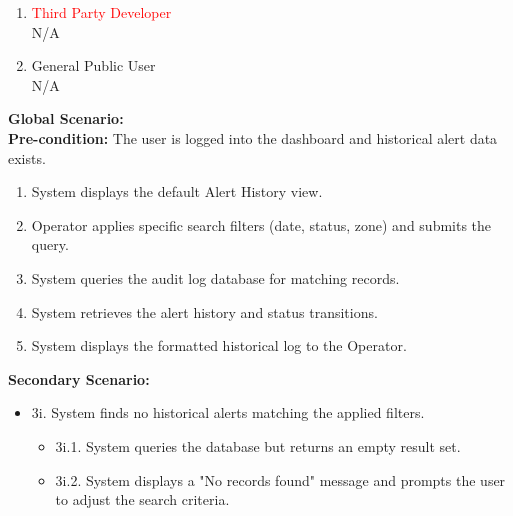{\begin{enumerate}[{\bf BE1.}]
\begin{enumerate}[{\bf VP1.}]
            {\bf Secondary Scenario:}
            \begin{itemize}
                \item[] {4i.} System finds no historical alerts matching the applied filters.
                \begin{itemize}
                    \item[] {4i.1.} System queries the database but returns an empty result set.
                    \item[] {4i.2.} System displays a "No historical alerts found for the selected criteria" message and prompts the Operator to clear or adjust the filters.
                \end{itemize}
            \end{itemize}
        \item \textcolor{red}{Third Party Developer} \\ N/A
        \item General Public User \\ N/A
    \end{enumerate}
    {\bf Global Scenario:} \\
    {\bf Pre-condition:} The user is logged into the dashboard and historical alert data exists.
        \begin{enumerate}[1. ]
            \item System displays the default Alert History view.
            \item Operator applies specific search filters (date, status, zone) and submits the query.
            \item System queries the audit log database for matching records.
            \item System retrieves the alert history and status transitions.
            \item System displays the formatted historical log to the Operator.
        \end{enumerate}

    {\bf Secondary Scenario:}
        \begin{itemize}
            \item[] {3i.} System finds no historical alerts matching the applied filters.
            \begin{itemize}
                \item[] {3i.1.} System queries the database but returns an empty result set.
                \item[] {3i.2.} System displays a "No records found" message and prompts the user to adjust the search criteria.
            \end{itemize}
        \end{itemize}


\end{enumerate}}
